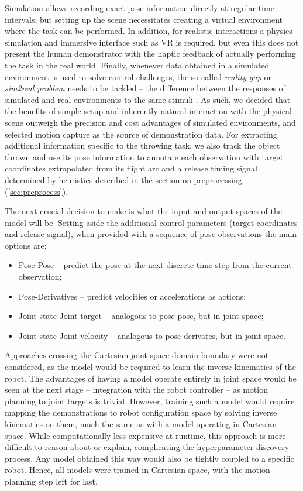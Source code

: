 \documentclass{article}
\begin{document}
Simulation allows recording exact pose information directly at regular time intervals, but setting up the scene necessitates creating a virtual environment where the task can be performed. In addition, for realistic interactions a physics simulation and immersive interface such as VR is required, but even this does not present the human demonstrator with the haptic feedback of actually performing the task in the real world. Finally, whenever data obtained in a simulated environment is used to solve control challenges, the so-called \emph{reality gap} or \emph{sim2real problem} needs to be tackled -- the difference between the responses of simulated and real environments to the same stimuli \cite{hofer2021sim2real}. As such, we decided that the benefits of simple setup and inherently natural interaction with the physical scene outweigh the precision and cost advantages of simulated environments, and selected motion capture as the source of demonstration data. For extracting additional information specific to the throwing task, we also track the object thrown and use its pose information to annotate each observation with target coordinates extrapolated from its flight arc and a release timing signal determined by heuristics described in the section on preprocessing (\ref{sec:preprocess}).

The next crucial decision to make is what the input and output spaces of the model will be. Setting aside the additional control parameters (target coordinates and release signal), when provided with a sequence of pose observations the main options are:
\begin{itemize}
	\item Pose-Pose -- predict the pose at the next discrete time step from the current observation;
	\item Pose-Derivatives -- predict velocities or accelerations as actions;
	\item Joint state-Joint target -- analogous to pose-pose, but in joint space;
	\item Joint state-Joint velocity -- analogous to pose-derivates, but in joint space.
\end{itemize}

Approaches crossing the Cartesian-joint space domain boundary were not considered, as the model would be required to learn the inverse kinematics of the robot. The advantages of having a model operate entirely in joint space would be seen at the next stage -- integration with the robot controller -- as motion planning to joint targets is trivial. However, training such a model would require mapping the demonstrations to robot configuration space by solving inverse kinematics on them, much the same as with a model operating in Cartesian space. While computationally less expensive at runtime, this approach is more difficult to reason about or explain, complicating the hyperparameter discovery process. Any model obtained this way would also be tightly coupled to a specific robot. Hence, all models were trained in Cartesian space, with the motion planning step left for last.
\end{document}

